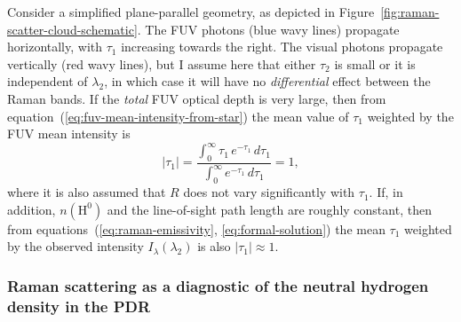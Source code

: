 \documentclass[useAMS, usenatbib, a4paper]{mnras}
\newcommand*\chem[1]{\ensuremath{\mathrm{#1}}}
\begin{document}
Consider a simplified plane-parallel geometry, as depicted in Figure~\ref{fig:raman-scatter-cloud-schematic}.
The FUV photons (blue wavy lines) propagate horizontally,
with \(\tau_1\) increasing towards the right.
The visual photons propagate vertically (red wavy lines), but I assume here that
either \(\tau_2\) is small or it is independent of \(\lambda_2\),
in which case it will have no \emph{differential} effect between the Raman bands.
If the \emph{total} FUV optical depth is very large,
then from equation~(\ref{eq:fuv-mean-intensity-from-star})
the mean value of \(\tau_1\) weighted by the FUV mean intensity is
\begin{equation}
  \label{eq:tau1-equals-unity}
  \vert \tau_1 \vert = \frac {\int_0^\infty \tau_1 \, e^{-\tau_1} \, d\tau_1}  {\int_0^\infty e^{-\tau_1} \, d\tau_1} = 1 , 
\end{equation}
where it is also assumed that \(R\) does not vary significantly with \(\tau_1\).
If, in addition, \(n(\chem{H^0})\) and the line-of-sight path length are roughly constant,
then from equations~(\ref{eq:raman-emissivity}, \ref{eq:formal-solution})
the mean \(\tau_1\) weighted by the observed intensity \(I_\lambda(\lambda_2)\) is also \(\vert \tau_1 \vert \approx 1\).

\subsubsection{Raman scattering as a diagnostic of
  the neutral hydrogen density in the PDR}
\label{sec:raman-scattering-as}
\end{document}
